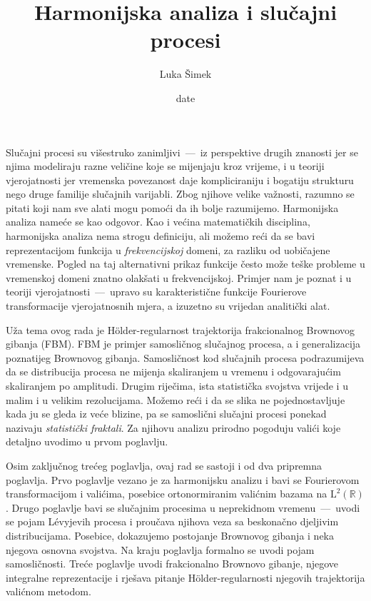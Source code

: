 \documentclass[a4paper,twoside,12pt]{memoir}
\title{Harmonijska analiza i slu\v{c}ajni procesi}
\author{Luka Šimek}
\date{date}
\numberwithin{teorem}{section}
\numberwithin{equation}{chapter}
\numberwithin{figure}{chapter}
\numberwithin{table}{chapter}
\newcommand{\R}{\mathbb{R}}
\newcommand{\holder}{H\" older}
\newcommand{\levy}{L\' evy}
\def\L{\mathrm{L}}
\begin{document}
\frontmatter

\begin{intro}
	Slučajni procesi su višestruko zanimljivi~---~iz perspektive drugih znanosti jer
	se njima modeliraju razne veličine koje se mijenjaju kroz vrijeme, i u teoriji vjerojatnosti
	jer vremenska povezanost daje kompliciraniju i bogatiju strukturu nego druge familije slučajnih varijabli.
	Zbog njihove velike važnosti, razumno se pitati koji nam
	sve alati mogu pomoći da ih bolje razumijemo. Harmonijska analiza nameće se kao odgovor.
	Kao i većina matematičkih disciplina, harmonijska analiza nema strogu definiciju, ali
	možemo reći da se bavi reprezentacijom funkcija u \emph{frekvencijskoj} domeni, za razliku
	od uobičajene vremenske. Pogled na taj alternativni prikaz funkcije često može teške
	probleme u vremenskoj domeni znatno olakšati u frekvencijskoj. Primjer nam
	je poznat i u teoriji vjerojatnosti~---~upravo su karakteristične funkcije Fourierove transformacije
	vjerojatnosnih mjera, a izuzetno su vrijedan analitički alat.

	Uža tema ovog rada je \holder -regularnost trajektorija frakcionalnog Brownovog gibanja (FBM).
	FBM je primjer samosličnog slučajnog procesa, a i generalizacija poznatijeg Brownovog gibanja. Samosličnost kod slučajnih procesa
	podrazumijeva da se distribucija procesa ne mijenja skaliranjem u vremenu i odgovarajućim skaliranjem po amplitudi. Drugim riječima, ista statistička svojstva
	vrijede i u malim i u velikim rezolucijama.
	Možemo reći i da se slika ne pojednostavljuje kada ju se gleda iz veće blizine, pa se
	samoslični slučajni procesi ponekad nazivaju \emph{statistički fraktali}.
	Za njihovu analizu prirodno pogoduju valići koje detaljno uvodimo u prvom poglavlju.%

	Osim zaključnog trećeg poglavlja, ovaj rad se sastoji i od dva pripremna poglavlja.
	Prvo poglavlje vezano je za harmonijsku analizu i bavi se Fourierovom transformacijom
	i valićima, posebice ortonormiranim valićnim bazama na \( \L^2(\R) \).
	Drugo poglavlje bavi se slučajnim procesima u neprekidnom vremenu~---~uvodi se pojam \levy jevih
	procesa i proučava njihova veza sa beskonačno djeljivim distribucijama. Posebice, dokazujemo
	postojanje Brownovog gibanja i neka njegova osnovna svojstva. Na kraju poglavlja formalno se uvodi pojam samosličnosti.
	Treće poglavlje uvodi frakcionalno Brownovo gibanje, njegove integralne reprezentacije i
	rješava pitanje \holder -regularnosti njegovih trajektorija valićnom metodom.


\end{intro}
\end{document}
